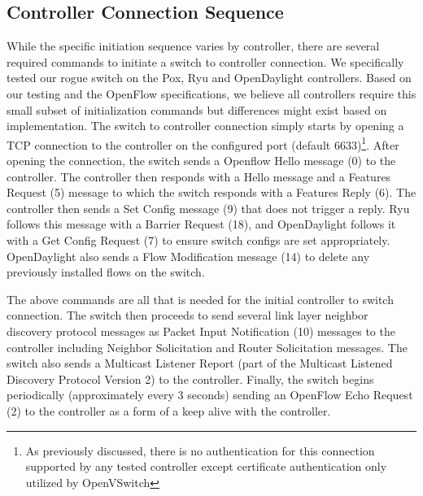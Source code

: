 \subsection {Controller Connection Sequence}
While the specific initiation sequence varies by controller, there are several required commands to initiate a switch to controller connection.  We specifically tested our rogue switch on the Pox, Ryu and OpenDaylight controllers. Based on our testing and the OpenFlow specifications, we believe all controllers require this small subset of initialization commands but differences might exist based on implementation. The switch to controller connection simply starts by opening a TCP connection to the controller on the configured port (default 6633)\footnote{As previously discussed, there is no authentication for this connection supported by any tested controller except certificate authentication only utilized by OpenVSwitch}.  After opening the connection, the switch sends a Openflow Hello message (0) to the controller. The controller then responds with a Hello message and a Features Request (5) message to which the switch responds with a  Features Reply (6). The controller then sends a Set Config message (9) that does not trigger a reply. Ryu follows this message with a Barrier Request (18), and OpenDaylight follows it with a  Get Config Request (7) to ensure switch configs are set appropriately. OpenDaylight also sends a Flow Modification message (14) to delete any previously installed flows on the switch.


The above commands are all that is needed for the initial controller to switch connection. The switch then proceeds to send several link layer neighbor discovery protocol messages as Packet Input Notification (10) messages to the controller including  Neighbor Solicitation and Router Solicitation messages. The switch also sends a Multicast Listener Report (part of the Multicast Listened Discovery Protocol Version 2) to the controller. Finally, the switch begins periodically (approximately every 3 seconds) sending an OpenFlow Echo Request (2) to the controller as a form of a keep alive with the controller.

